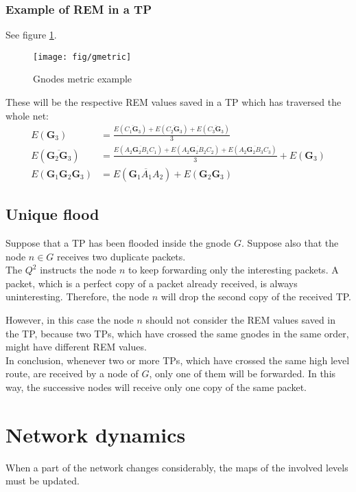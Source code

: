 \documentclass[a4paper]{article}
\begin{document}
\subsubsection*{Example of REM in a TP}
See figure \ref{fig:gmetric}.
\begin{figure}[h]
	\begin{center}
		\texttt{[image: fig/gmetric]}
	\end{center}
	\caption{Gnodes metric example}
	\label{fig:gmetric}
\end{figure}

These will be the respective REM values saved in a TP which has traversed the
whole net:
\begin{align*}
	E(\mathbf{G}_3)&=\frac{E(\overline{C_1 \mathbf{G}_3})+E(\overline{C_2 \mathbf{G}_3})
	+E(\overline{C_3 \mathbf{G}_3})}{3} \\ 
	E(\overline{\mathbf{G}_2\mathbf{G}_3})&=
	\frac{
		E(\overline{A_2 \mathbf{\mathbf{G}}_2  B_1 C_1})+
		E(\overline{A_2 \mathbf{\mathbf{G}}_2  B_2 C_2})+
		E(\overline{A_2 \mathbf{\mathbf{G}}_2  B_3 C_3})
	     }{3} + 
	     E(\mathbf{\mathbf{G}}_3)\\
	E(\mathbf{G}_1\mathbf{G}_2\mathbf{G}_3)&= 
		E(\overline{\mathbf{\mathbf{G}}_1 A_1 A_2})+
		E(\mathbf{G}_2\mathbf{G}_3)
\end{align*}

\subsection{Unique flood}
Suppose that a TP has been flooded inside the gnode $G$.
Suppose also that the node $n \in G$ receives two duplicate packets.\\
The $Q^2$ instructs the node $n$ to keep forwarding only the interesting packets.
A packet, which is a perfect copy of a packet already received, is always
uninteresting. Therefore, the node $n$ will drop the second copy of the
received TP. 

However, in this case the node $n$ should not consider the REM
values saved in the TP, because two TPs, which have crossed the same
gnodes in the same order, might have different REM values.
\\

In conclusion, whenever two or more TPs, which have crossed the same high level
route, are received by a node of $G$, only one of them will be forwarded. In
this way, the successive nodes will receive only one copy of the same packet.

\section{Network dynamics}
When a part of the network changes considerably, the maps of the involved
levels must be updated.
\end{document}
